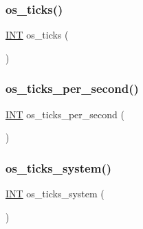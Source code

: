 \subsubsection{\texorpdfstring{os\+\_\+ticks()}{os\_ticks()}}
{\footnotesize\ttfamily \mbox{\hyperlink{galois_8h_a09fddde158a3a20bd2dcadb609de11dc}{I\+NT}} os\+\_\+ticks (\begin{DoxyParamCaption}{ }\end{DoxyParamCaption})}

\mbox{\label{util_8_c_a1b35e7a094dfde9db39ae352c9c17042}} 
\subsubsection{\texorpdfstring{os\+\_\+ticks\+\_\+per\+\_\+second()}{os\_ticks\_per\_second()}}
{\footnotesize\ttfamily \mbox{\hyperlink{galois_8h_a09fddde158a3a20bd2dcadb609de11dc}{I\+NT}} os\+\_\+ticks\+\_\+per\+\_\+second (\begin{DoxyParamCaption}{ }\end{DoxyParamCaption})}

\mbox{\label{util_8_c_acff4709d0a21a2f5462713436eca5051}} 
\subsubsection{\texorpdfstring{os\+\_\+ticks\+\_\+system()}{os\_ticks\_system()}}
{\footnotesize\ttfamily \mbox{\hyperlink{galois_8h_a09fddde158a3a20bd2dcadb609de11dc}{I\+NT}} os\+\_\+ticks\+\_\+system (\begin{DoxyParamCaption}{ }\end{DoxyParamCaption})}

\mbox{\label{util_8_c_a0d715587fd9b8ab4e2bc822a2be313ba}} 
